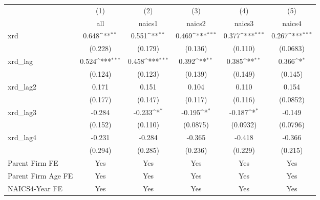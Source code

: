 {
\def\sym#1{\ifmmode^{#1}\else\(^{#1}\)\fi}
\begin{tabular}{l*{5}{c}}
\hline\hline
            &\multicolumn{1}{c}{(1)}&\multicolumn{1}{c}{(2)}&\multicolumn{1}{c}{(3)}&\multicolumn{1}{c}{(4)}&\multicolumn{1}{c}{(5)}\\
            &\multicolumn{1}{c}{all}&\multicolumn{1}{c}{naics1}&\multicolumn{1}{c}{naics2}&\multicolumn{1}{c}{naics3}&\multicolumn{1}{c}{naics4}\\
\hline
xrd         &       0.648\sym{**} &       0.551\sym{**} &       0.469\sym{***}&       0.377\sym{***}&       0.267\sym{***}\\
            &     (0.228)         &     (0.179)         &     (0.136)         &     (0.110)         &    (0.0683)         \\
[1em]
xrd\_lag     &       0.524\sym{***}&       0.458\sym{***}&       0.392\sym{**} &       0.385\sym{**} &       0.366\sym{*}  \\
            &     (0.124)         &     (0.123)         &     (0.139)         &     (0.149)         &     (0.145)         \\
[1em]
xrd\_lag2    &       0.171         &       0.151         &       0.104         &       0.110         &       0.154         \\
            &     (0.177)         &     (0.147)         &     (0.117)         &     (0.116)         &    (0.0852)         \\
[1em]
xrd\_lag3    &      -0.284         &      -0.233\sym{*}  &      -0.195\sym{*}  &      -0.187\sym{*}  &      -0.149         \\
            &     (0.152)         &     (0.110)         &    (0.0875)         &    (0.0932)         &    (0.0796)         \\
[1em]
xrd\_lag4    &      -0.231         &      -0.284         &      -0.365         &      -0.418         &      -0.366         \\
            &     (0.294)         &     (0.285)         &     (0.236)         &     (0.229)         &     (0.215)         \\
[1em]
Parent Firm FE&         Yes         &         Yes         &         Yes         &         Yes         &         Yes         \\
[1em]
Parent Firm Age FE&         Yes         &         Yes         &         Yes         &         Yes         &         Yes         \\
[1em]
NAICS4-Year FE&         Yes         &         Yes         &         Yes         &         Yes         &         Yes         \\

\end{tabular}}
